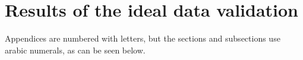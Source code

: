 \chapter{Results of the ideal data validation}
\label{app:B}
Appendices are numbered with letters, but the sections and subsections use
arabic numerals, as can be seen below.

%
%


